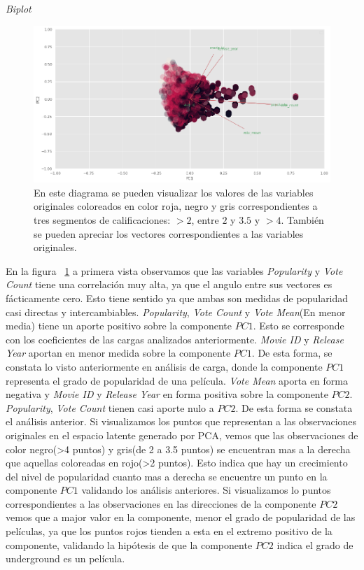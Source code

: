 \documentclass[11pt,a4paper,twoside]{thesis}
\begin{document}
\clearpage

\begin{description}
	\item[\textit{Biplot}]
\end{description}

\begin{figure}[h!]
	\centering
	\includegraphics[width=15cm]{./images/PCA-biplot.png}
	\caption{En este diagrama se pueden visualizar los valores de las variables originales coloreados en color roja, negro y gris correspondientes a tres segmentos de calificaciones: $>2$, entre $2$ y $3.5$ y $>4$. También se pueden apreciar los vectores correspondientes a las variables originales.}
	\label{fig:biplot}
\end{figure}

En la figura ~\ref{fig:biplot} a primera vista observamos que las variables
\textit{Popularity} y \textit{Vote Count} tiene una correlación muy alta, ya
que el angulo entre sus vectores es fácticamente cero. Esto tiene sentido ya
que ambas son medidas de popularidad casi directas y intercambiables.
\textit{Popularity}, \textit{Vote Count} y \textit{Vote Mean}(En menor media)
tiene un aporte positivo sobre la componente $PC1$. Esto se corresponde con los
coeficientes de las cargas analizados anteriormente. \textit{Movie ID } y
\textit{Release Year} aportan en menor medida sobre la componente $PC1$. De
esta forma, se constata lo visto anteriormente en análisis de carga, donde la
componente $PC1$ representa el grado de popularidad de una película.
\textit{Vote Mean} aporta en forma negativa y \textit{Movie ID } y
\textit{Release Year} en forma positiva sobre la componente $PC2$.
\textit{Popularity}, \textit{Vote Count} tienen casi aporte nulo a $PC2$. De
esta forma se constata el análisis anterior. Si visualizamos los puntos que
representan a las observaciones originales en el espacio latente generado por
PCA, vemos que las observaciones de color negro(>4 puntos) y gris(de 2 a 3.5
puntos) se encuentran mas a la derecha que aquellas coloreadas en rojo(>2
puntos). Esto indica que hay un crecimiento del nivel de popularidad cuanto mas
a derecha se encuentre un punto en la componente $PC1$ validando los análisis
anteriores. Si visualizamos lo puntos correspondientes a las observaciones en
las direcciones de la componente $PC2$ vemos que a major valor en la
componente, menor el grado de popularidad de las películas, ya que los puntos
rojos tienden a esta en el extremo positivo de la componente, validando la
hipótesis de que la componente $PC2$ indica el grado de underground es un
película.
\end{document}
